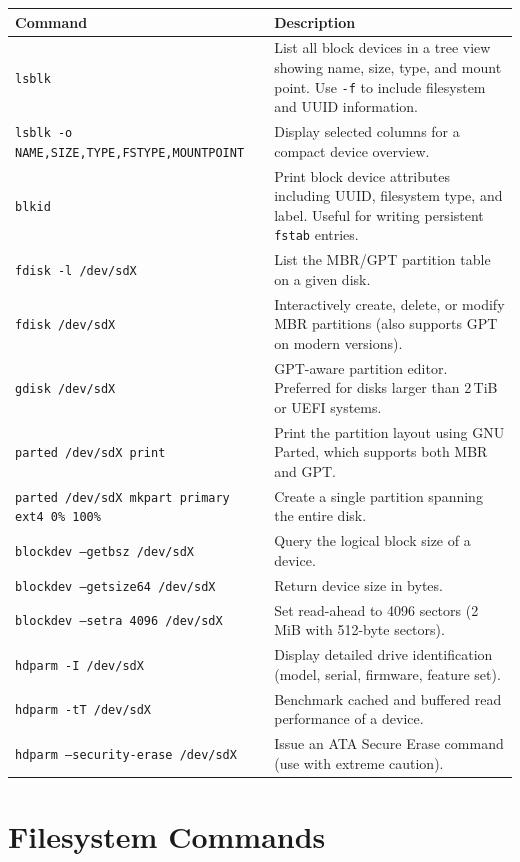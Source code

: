 \begin{longtable}{p{4cm} p{8cm}}
\toprule
\textbf{Command} & \textbf{Description} \\
\midrule
\endhead
\texttt{lsblk} & List all block devices in a tree view showing name, size, type, and mount point. Use \texttt{-f} to include filesystem and UUID information. \\
\texttt{lsblk -o NAME,SIZE,TYPE,FSTYPE,MOUNTPOINT} & Display selected columns for a compact device overview. \\
\texttt{blkid} & Print block device attributes including UUID, filesystem type, and label. Useful for writing persistent \texttt{fstab} entries. \\
\texttt{fdisk -l /dev/sdX} & List the MBR/GPT partition table on a given disk. \\
\texttt{fdisk /dev/sdX} & Interactively create, delete, or modify MBR partitions (also supports GPT on modern versions). \\
\texttt{gdisk /dev/sdX} & GPT-aware partition editor. Preferred for disks larger than 2\,TiB or UEFI systems. \\
\texttt{parted /dev/sdX print} & Print the partition layout using GNU Parted, which supports both MBR and GPT. \\
\texttt{parted /dev/sdX mkpart primary ext4 0\% 100\%} & Create a single partition spanning the entire disk. \\
\texttt{blockdev --getbsz /dev/sdX} & Query the logical block size of a device. \\
\texttt{blockdev --getsize64 /dev/sdX} & Return device size in bytes. \\
\texttt{blockdev --setra 4096 /dev/sdX} & Set read-ahead to 4096 sectors (2\,MiB with 512-byte sectors). \\
\texttt{hdparm -I /dev/sdX} & Display detailed drive identification (model, serial, firmware, feature set). \\
\texttt{hdparm -tT /dev/sdX} & Benchmark cached and buffered read performance of a device. \\
\texttt{hdparm --security-erase /dev/sdX} & Issue an ATA Secure Erase command (use with extreme caution). \\
\bottomrule
\end{longtable}

\section*{Filesystem Commands}

